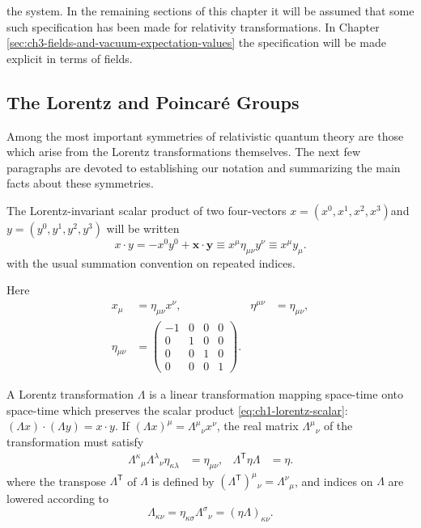 the system. In the remaining sections of this chapter it will be assumed that
some such specification has been made for relativity transformations. In
Chapter \ref{sec:ch3-fields-and-vacuum-expectation-values} the specification will be made explicit in terms of fields.

\subsection{The Lorentz and Poincar\'e Groups}\label{sec:1.3}

Among the most important symmetries of relativistic quantum theory are those
which arise from the Lorentz transformations themselves. The next few
paragraphs are devoted to establishing our notation and summarizing the main
facts about these symmetries.

The Lorentz-invariant scalar product of two four-vectors
$x=(x^0,x^1,x^2,x^3)$\linebreak[1] and
$y=(y^0,y^1,y^2,y^3)$ will be written
\begin{equation}
  x\mathbin{\cdot} y
  =-x^0y^0+\mathbf{x}\mathbin{\cdot}\mathbf{y}
  \equiv x^\mu\eta_{\mu\nu}y^\nu
  \equiv x^\mu y_\mu .
  \tag{1-4}\label{eq:ch1-lorentz-scalar}
\end{equation}
with the usual summation convention on repeated indices.

Here
\[
\begin{aligned}
  x_\mu&=\eta_{\mu\nu}x^\nu,
  & \eta^{\mu\nu}&=\eta_{\mu\nu},\\
  \eta_{\mu\nu}&=
  \begin{pmatrix}
    -1&0&0&0\\
    0&1&0&0\\
    0&0&1&0\\
    0&0&0&1
  \end{pmatrix}.
\end{aligned}
\]

A Lorentz transformation $\Lambda$ is a linear transformation mapping space-time
onto space-time which preserves the scalar product \eqref{eq:ch1-lorentz-scalar}:
$(\Lambda x)\mathbin{\cdot}(\Lambda y)=x\mathbin{\cdot}y$. If
$(\Lambda x)^\mu=\Lambda^\mu{}_\nu x^\nu$, the real matrix
$\Lambda^\mu{}_\nu$ of the
transformation must satisfy
\begin{equation}
\begin{aligned}
  \Lambda^\kappa{}_\mu\Lambda^\lambda{}_\nu\eta_{\kappa\lambda}
  &=\eta_{\mu\nu},
  & \Lambda^{\mathsf T}\eta\Lambda&=\eta .
\end{aligned}
  \tag{1-5}\label{eq:ch1-lorentz-condition}
\end{equation}
where the transpose $\Lambda^{\mathsf T}$ of $\Lambda$ is defined by
$(\Lambda^{\mathsf T})^\mu{}_\nu=\Lambda^\nu{}_\mu$, and indices on
$\Lambda$ are lowered
according to
\[
  \Lambda_{\kappa\nu}=\eta_{\kappa\sigma}\Lambda^\sigma{}_\nu
  =(\eta\Lambda)_{\kappa\nu}.
\]

